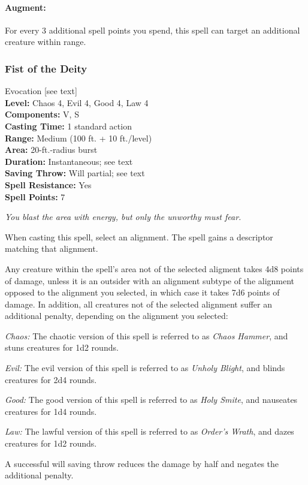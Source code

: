 \paragraph{Augment:} For every 3 additional spell points you spend, this spell can target an additional creature within range.
\subsubsection{Fist of the Deity}
\label{Spell:FistOfTheDeity}
Evocation [see text]
\\ \textbf{Level:} Chaos 4, Evil 4, Good 4, Law 4
\\ \textbf{Components:} V, S
\\ \textbf{Casting Time:} 1 standard action
\\ \textbf{Range:} Medium (100 ft. + 10 ft./level)
\\ \textbf{Area:} 20-ft.-radius burst
\\ \textbf{Duration:} Instantaneous; see text
\\ \textbf{Saving Throw:} Will partial; see text
\\ \textbf{Spell Resistance:} Yes
\\ \textbf{Spell Points:} 7

\emph{You blast the area with energy, but only the unworthy must fear.}

When casting this spell, select an alignment. The spell gains a descriptor matching that alignment.

Any creature within the spell's area not of the selected aligment takes 4d8 points of damage, 
unless it is an outsider with an alignment subtype of the alignment opposed to the alignment you selected,
in which case it takes 7d6 points of damage.
In addition, all creatures not of the selected alignment suffer an additional penalty, depending on the alignment you selected:
\begin{list}{}{\leftmargin=1em}
 \item \emph{Chaos:} The chaotic version of this spell is referred to as \emph{Chaos Hammer}, and stuns creatures for 1d2 rounds.
 \item \emph{Evil:} The evil version of this spell is referred to as \emph{Unholy Blight}, and blinds creatures for 2d4 rounds.
 \item \emph{Good:} The good version of this spell is referred to as \emph{Holy Smite}, and nauseates creatures for 1d4 rounds.
 \item \emph{Law:} The lawful version of this spell is referred to as \emph{Order's Wrath}, and dazes creatures for 1d2 rounds.
\end{list}
A successful will saving throw reduces the damage by half and negates the additional penalty.

